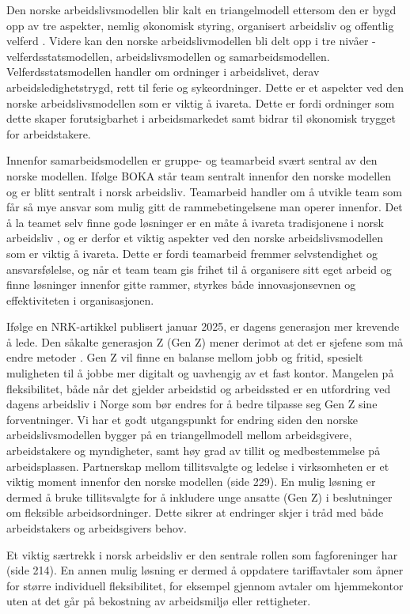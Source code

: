 Den norske arbeidslivsmodellen blir kalt en triangelmodell ettersom den er bygd opp av tre aspekter, nemlig økonomisk styring, organisert arbeidsliv og offentlig velferd \cite{Teknologiledelse}. Videre kan den norske arbeidslivmodellen bli delt opp i tre nivåer - velferdsstatsmodellen, arbeidslivsmodellen og samarbeidsmodellen. Velferdsstatsmodellen handler om ordninger i arbeidslivet, derav arbeidsledighetstrygd, rett til ferie og sykeordninger. Dette er et aspekter ved den norske arbeidslivsmodellen som er viktig å ivareta. Dette er fordi ordninger som dette skaper forutsigbarhet i arbeidsmarkedet samt bidrar til økonomisk trygget for arbeidstakere.
 
Innenfor samarbeidsmodellen er gruppe- og teamarbeid svært sentral av den norske modellen. Ifølge BOKA står team sentralt innenfor den norske modellen og er blitt sentralt i norsk arbeidsliv. Teamarbeid handler om å utvikle team som får så mye ansvar som mulig gitt de rammebetingelsene man operer innenfor. Det å la teamet selv finne gode løsninger er en måte å ivareta tradisjonene i norsk arbeidsliv \cite{BOKA}, og er derfor et viktig aspekter ved den norske arbeidslivsmodellen som er viktig å ivareta. Dette er fordi teamarbeid fremmer selvstendighet og ansvarsfølelse, og når et team team gis frihet til å organisere sitt eget arbeid og finne løsninger innenfor gitte rammer, styrkes både innovasjonsevnen og effektiviteten i organisasjonen.
 
Ifølge en NRK-artikkel publisert januar 2025, er dagens generasjon mer krevende å lede. Den såkalte generasjon Z (Gen Z) mener derimot at det er sjefene som må endre metoder \cite{NRK}. Gen Z vil finne en balanse mellom jobb og fritid, spesielt muligheten til å jobbe mer digitalt og uavhengig av et fast kontor.  Mangelen på fleksibilitet, både når det gjelder arbeidstid og arbeidssted er en utfordring ved dagens arbeidsliv i Norge som bør endres for å bedre tilpasse seg Gen Z sine forventninger. Vi har et godt utgangspunkt for endring siden den norske arbeidslivsmodellen bygger på en triangellmodell mellom arbeidsgivere, arbeidstakere og myndigheter, samt høy grad av tillit og medbestemmelse på arbeidsplassen. Partnerskap mellom tillitsvalgte og ledelse i virksomheten er et viktig moment innenfor den norske modellen \cite{Teknologiledelse} (side 229). En mulig løsning er dermed å bruke tillitsvalgte for å inkludere unge ansatte (Gen Z) i beslutninger om fleksible arbeidsordninger. Dette sikrer at endringer skjer i tråd med både arbeidstakers og arbeidsgivers behov.
 
 
Et viktig særtrekk i norsk arbeidsliv er den sentrale rollen som fagforeninger har \cite{Teknologiledese} (side 214). En annen mulig løsning er dermed å oppdatere tariffavtaler som åpner for større individuell fleksibilitet, for eksempel gjennom avtaler om hjemmekontor uten at det går på bekostning av arbeidsmiljø eller rettigheter. 